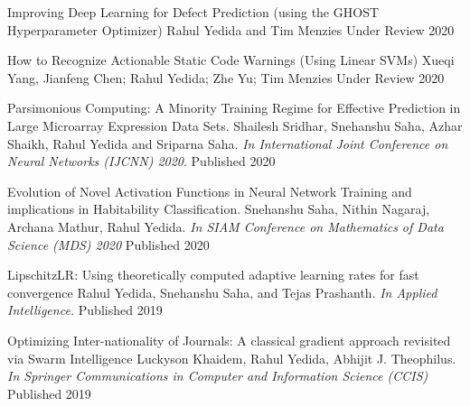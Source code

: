 


\begin{cvhonors}

    \cvhonor
        {Improving Deep Learning for Defect Prediction (using the GHOST Hyperparameter Optimizer)}
        {Rahul Yedida and Tim Menzies}
        {Under Review}
        {2020}

    \cvhonor
        {How to Recognize Actionable Static Code Warnings (Using Linear SVMs)}
        {Xueqi Yang, Jianfeng Chen; Rahul Yedida; Zhe Yu; Tim Menzies}
        {Under Review}
        {2020}

    \cvhonor
        {Parsimonious Computing: A Minority Training Regime for Effective Prediction in Large Microarray Expression Data Sets.}
        {Shailesh Sridhar, Snehanshu Saha, Azhar Shaikh, Rahul Yedida and Sriparna Saha.  \textit{In International Joint Conference on Neural Networks (IJCNN) 2020}.}
        {Published}
        {2020}

    \cvhonor
        {Evolution of Novel Activation Functions in Neural Network Training and implications in Habitability Classification.}
        {Snehanshu Saha, Nithin Nagaraj, Archana Mathur, Rahul Yedida. \textit{In SIAM Conference on Mathematics of Data Science (MDS) 2020}}
        {Published}
        {2020}

  \cvhonor
    {LipschitzLR: Using theoretically computed adaptive learning rates for fast convergence}
    {Rahul Yedida, Snehanshu Saha, and Tejas Prashanth. \textit{In Applied Intelligence.}}
    {Published} %
    {2019} %

  \cvhonor
    {Optimizing Inter-nationality of Journals: A classical gradient approach revisited via Swarm Intelligence}
    {Luckyson Khaidem, Rahul Yedida, Abhijit J. Theophilus. \textit{In Springer Communications in Computer and Information Science (CCIS)}}
    {Published} %
    {2019} %
    
\end{cvhonors}